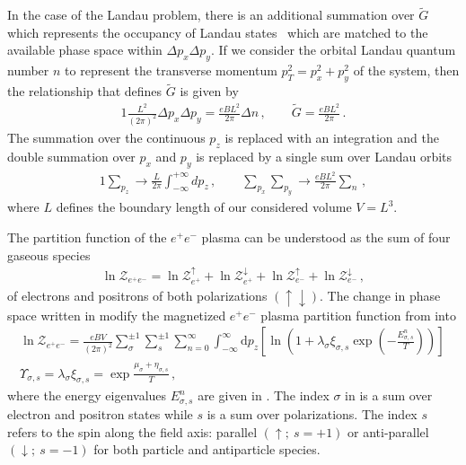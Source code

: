 In the case of the Landau problem, there is an additional summation over $\widetilde{G}$ which represents the occupancy of Landau states~\cite{greiner2012thermodynamics} which are matched to the available phase space within $\Delta p_{x}\Delta p_{y}$. If we consider the orbital Landau quantum number $n$ to represent the transverse momentum $p_{T}^{2}=p_{x}^{2}+p_{y}^{2}$ of the system, then the relationship that defines $\widetilde{G}$ is given by
\begin{alignat}{1}
    \label{phase:1} \frac{L^{2}}{(2\pi)^{2}}\Delta p_{x}\Delta p_{y}=\frac{eBL^{2}}{2\pi}\Delta n\,,\qquad\widetilde{G}=\frac{eBL^{2}}{2\pi}\,.
\end{alignat}
The summation over the continuous $p_{z}$ is replaced with an integration and the double summation over $p_{x}$ and $p_{y}$ is replaced by a single sum over Landau orbits
\begin{alignat}{1}
    \label{phase:2}
    \sum_{p_{z}}\rightarrow\frac{L}{2\pi}\int^{+\infty}_{-\infty}dp_{z}\,,\qquad\sum_{p_{x}}\sum_{p_{y}}\rightarrow\frac{eBL^{2}}{2\pi}\sum_{n}\,,
\end{alignat}
where $L$ defines the boundary length of our considered volume $V=L^{3}$.

The partition function of the $e^{+}e^{-}$ plasma can be understood as the sum of four gaseous species
\begin{align}
    \label{partition:0}    
    \ln\mathcal{Z}_{e^{+}e^{-}}=\ln\mathcal{Z}_{e^{+}}^{\uparrow}+\ln\mathcal{Z}_{e^{+}}^{\downarrow}+\ln\mathcal{Z}_{e^{-}}^{\uparrow}+\ln\mathcal{Z}_{e^{-}}^{\downarrow}\,,
\end{align}
of electrons and positrons of both polarizations $(\uparrow\downarrow)$. The change in phase space written in  modify the magnetized $e^{+}e^{-}$ plasma partition function from  into
\begin{gather}
     \label{partition:1}
     \ln\mathcal{Z}_{e^{+}e^{-}}=\frac{e{B}V}{(2\pi)^{2}}\sum_{\sigma}^{\pm1}\sum_{s}^{\pm1}\sum_{n=0}^{\infty}\int_{-\infty}^{\infty}\mathrm{d}p_{z}\left[\ln\left(1+\lambda_{\sigma}\xi_{\sigma,s}\exp\left(-\frac{E_{\sigma,s}^{n}}{T}\right)\right)\right]\,\\
    \label{partition:2}    
    \Upsilon_{\sigma,s} =\lambda_{\sigma}\xi_{\sigma,s} = \exp{\frac{\mu_{\sigma}+\eta_{\sigma,s}}{T}}\,,
\end{gather}
where the energy eigenvalues $E_{\sigma,s}^{n}$ are given in . The index $\sigma$ in  is a sum over electron and positron states while $s$ is a sum over polarizations. The index $s$ refers to the spin along the field axis: parallel $(\uparrow;\ s=+1)$ or anti-parallel $(\downarrow;\ s=-1)$ for both particle and antiparticle species.

